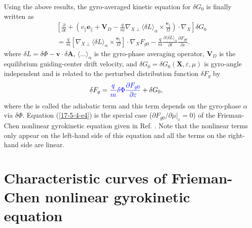 \documentclass{article}
\newcommand{\nobracket}{}
\newcommand{\tmcolor}[2]{{\color{#1}{#2}}}
\newcommand{\tmmathbf}[1]{\ensuremath{\boldsymbol{#1}}}
\begin{document}
Using the above results, the gyro-averaged kinetic equation for $\delta G_0$
is finally written as
\begin{eqnarray}
  &  & \left[ \frac{\partial}{\partial t} + \left( v_{\parallel}
  \mathbf{e}_{\parallel} +\mathbf{V}_D - \frac{q}{m} \nabla_{X \perp} \langle
  \delta L \rangle_{\alpha} \times \frac{\tmmathbf{e}_{\parallel}}{\Omega}
  \right) \cdot \nabla_X \right] \delta G_0 \nonumber\\
  &  & = \frac{q}{m} \left[ \nabla_{X \perp} \langle \delta L
  \rangle_{\alpha} \times \frac{\tmmathbf{e}_{\parallel}}{\Omega} \right]
  \cdot \nabla_X F_{g 0} - \frac{q}{m}  \frac{\partial \langle \delta L
  \rangle_{\alpha}}{\partial t}  \frac{\partial F_{g 0}}{\partial \varepsilon}
  .  \label{17-5-4-e4}
\end{eqnarray}
where $\delta L = \delta \Phi -\mathbf{v} \cdot \delta \mathbf{A}$, $\langle
\ldots \rangle_{\alpha}$ is the gyro-phase averaging operator, $\mathbf{V}_D$
is the equilibrium guiding-center drift velocity, and $\delta G_0 = \delta G_0
(\mathbf{X}, \varepsilon, \mu)$ is gyro-angle independent and is related to
the perturbed distribution function $\delta F_g$ by
\begin{equation}
  \delta F_g = \tmcolor{blue}{\frac{q}{m} \delta \Phi \frac{\partial F_{g
  0}}{\partial \varepsilon}} + \delta G_0,
\end{equation}
where the \tmcolor{blue}{first term} is called the adiabatic term and this
term depends on the gyro-phase $\alpha$ via $\delta \Phi$. Equation
(\ref{17-5-4-e4}) is the special case ($\partial F_{g 0} / \partial \mu
|_{\varepsilon} \nobracket = 0$) of the Frieman-Chen nonlinear gyrokinetic
equation given in Ref. {\cite{frieman1982}}. Note that the nonlinear terms
only appear on the left-hand side of this equation and all the terms on the
right-hand side are linear.

\section{Characteristic curves of Frieman-Chen nonlinear gyrokinetic equation}
\end{document}
